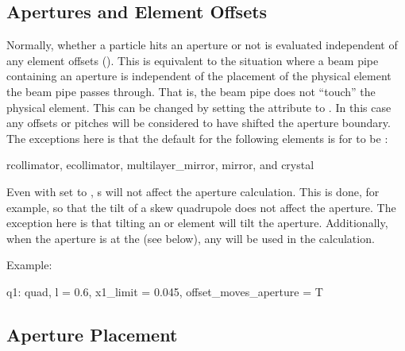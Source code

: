 \subsection{Apertures and Element Offsets}
\label{ss:offset.ap}

Normally, whether a particle hits an aperture or not is evaluated
independent of any element offsets (). This is
equivalent to the situation where a beam pipe containing an aperture
is independent of the placement of the physical element the beam pipe
passes through. That is, the beam pipe does not ``touch'' the physical
element. This can be changed by setting the 
attribute to . In this case any offsets or pitches will be
considered to have shifted the aperture boundary. The exceptions here
is that the default for the following elements is for
 to be :
\begin{example}
  rcollimator, 
  ecollimator,
  multilayer_mirror, 
  mirror, and 
  crystal 
\end{example}

Even with  set to , s will
not affect the aperture calculation. This is done, for example, so
that the tilt of a skew quadrupole does not affect the aperture. The
exception here is that tilting an  or 
element will tilt the aperture. Additionally, when the aperture is at
the  (see below), any  will be used in the
calculation.

Example:
\begin{example}
  q1: quad, l = 0.6, x1_limit = 0.045, offset_moves_aperture = T
\end{example}

\subsection{Aperture Placement}
\label{ss:ap.place}


